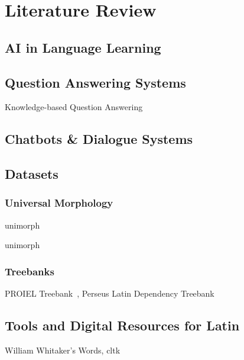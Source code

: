 \graphicspath{{content/chapters/3_literature_review/figures/}}

\chapter{Literature Review}%
\label{chp:literature_review}

\section{AI in Language Learning}
\label{sec:ai_in_language_learning}

\section{Question Answering Systems}
\label{sec:question_answering_systems}

Knowledge-based Question Answering

\section{Chatbots \& Dialogue Systems}
\label{sec:chatbots_dialogue_systems}

\section{Datasets}
\label{sec:datasets}

\subsection{Universal Morphology}
\label{sec:universal_morphology}

\gls{unimorph}

unimorph~\cite{unimorph}

\subsection{Treebanks}
\label{sec:treebanks}

PROIEL Treebank~\cite{proiel}, Perseus Latin Dependency Treebank~\cite{10.1007/978-3-642-20227-8_5}

\section{Tools and Digital Resources for Latin}
\label{sec:tools_and_digital_resources_for_latin}

William Whitaker's Words, \gls{cltk}

